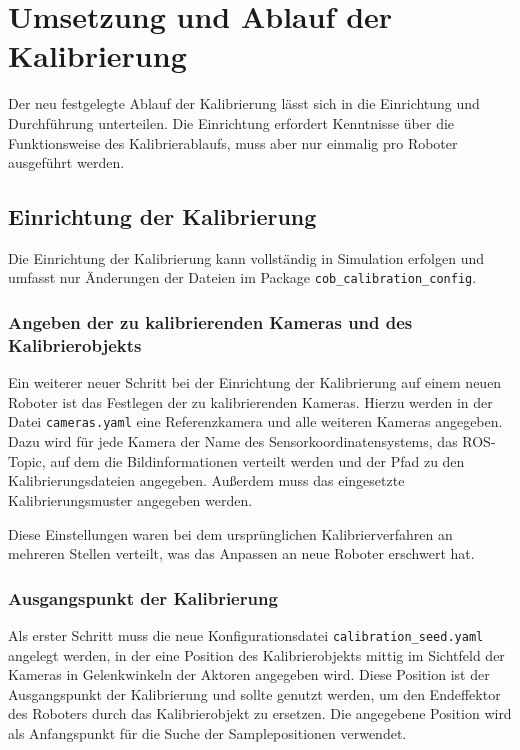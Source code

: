 \chapter{Umsetzung und Ablauf der Kalibrierung}

Der neu festgelegte Ablauf der Kalibrierung lässt sich in die 
Einrichtung und Durchführung unterteilen. Die Einrichtung erfordert Kenntnisse
über die Funktionsweise des Kalibrierablaufs, muss aber nur einmalig pro Roboter
ausgeführt werden.

\section{Einrichtung der Kalibrierung}
\label{sec:Einrichtung der Kalibrierung}

Die Einrichtung der Kalibrierung kann vollständig in Simulation erfolgen und 
umfasst nur Änderungen der Dateien im Package \texttt{cob\_calibration\_config}. 


\subsection{Angeben der zu kalibrierenden Kameras und des Kalibrierobjekts}
\label{sub:Angeben der zu kalibrierenden Kameras}

Ein weiterer neuer Schritt bei der Einrichtung der Kalibrierung auf einem neuen
Roboter ist das Festlegen der zu kalibrierenden Kameras. Hierzu werden in der 
Datei \texttt{cameras.yaml} eine Referenzkamera und alle weiteren Kameras angegeben.
Dazu wird für jede Kamera der Name des Sensorkoordinatensystems, das
\ac{ROS}-Topic, auf dem die Bildinformationen verteilt werden und der Pfad zu den
Kalibrierungsdateien angegeben. Außerdem muss das eingesetzte Kalibrierungsmuster
angegeben werden. 

Diese Einstellungen waren bei dem ursprünglichen Kalibrierverfahren an mehreren 
Stellen verteilt, was das Anpassen an neue Roboter erschwert hat.
\subsection{Ausgangspunkt der Kalibrierung}
\label{sub:Ausgangspunkt der Kalibrierung}

Als
erster Schritt muss die neue Konfigurationsdatei \texttt{calibration\_seed.yaml} 
angelegt werden, in der eine Position des Kalibrierobjekts mittig im Sichtfeld
der Kameras in Gelenkwinkeln der Aktoren angegeben wird. Diese Position ist der Ausgangspunkt
der Kalibrierung und sollte genutzt werden, um den Endeffektor des Roboters durch 
das Kalibrierobjekt zu ersetzen. Die angegebene Position wird als Anfangspunkt 
für die Suche der Samplepositionen verwendet.

